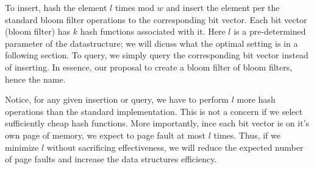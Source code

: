 To insert, hash the element $l$ times mod $w$ and insert the element per the standard bloom filter operations to the corresponding bit vector.
Each bit vector (bloom filter) has $k$ hash functions associated with it.
Here $l$ is a pre-determined parameter of the datastructure; we will dicuss what the optimal setting is in a following section.
To query, we simply query the corresponding bit vector instead of inserting.
In essence, our proposal to create a bloom filter of bloom filters, hence the name.

Notice, for any given insertion or query, we have to perform $l$ more hash operations than the standard implementation. 
This is not a concern if we select sufficiently cheap hash functions.
More importantly, ince each bit vector is on it's own page of memory, we expect to page fault at most $l$ times.
 Thus, if we minimize $l$ without sacrificing effectiveness, we will reduce the expected number of page faults and increase the data structures efficiency.